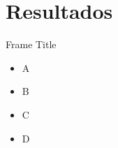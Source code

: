\section{Resultados}

\begin{frame}{Frame Title}
    \begin{itemize}
        \item A
        \item B
        \item C 
        \item D 
    \end{itemize}
\end{frame}


